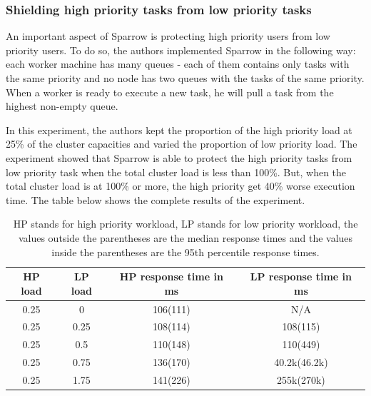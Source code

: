 \documentclass[11pt]{article}
\begin{document}
        
        \subsubsection*{Shielding high priority tasks from low priority tasks}
        	 \label{preemption}
        	
            An important aspect of Sparrow is protecting high priority users from low priority users. To do so, the authors implemented Sparrow in the following way: each worker machine has many queues - each of them contains only tasks with the same priority and no node has two queues with the tasks of the same priority. When a worker is ready to execute a new task, he will pull a task from the highest non-empty queue.
            
            In this experiment, the authors kept the proportion of the high priority load at 25\% of the cluster capacities and varied the proportion of low priority load. The experiment showed that Sparrow is able to protect the high priority tasks from low priority task when the total cluster load is less than 100\%. But, when the total cluster load is at 100\% or more, the high priority get 40\% worse execution time. The table below shows the complete results of the experiment.
            
            \begin{table}
				\caption{HP stands for high priority workload, LP stands for low priority workload, the values outside the parentheses are the median response times and the values inside the parentheses are the 95th percentile response times.}
				\centering
                \begin{tabular}{ | c | c | c | c |}
                    \hline
                    HP load & LP load & HP response time in ms & LP response time in ms  \\ \hline
                    0.25 & 0 & 106(111) & N/A  \\ \hline
                    0.25 & 0.25 & 108(114) & 108(115) \\ \hline
                    0.25 & 0.5 & 110(148) & 110(449) \\ \hline
                    0.25 & 0.75 & 136(170) & 40.2k(46.2k) \\ \hline
                    0.25 & 1.75 & 141(226) & 255k(270k) \\
                    \hline
                \end{tabular}
        	\end{table}
        	
\end{document}

